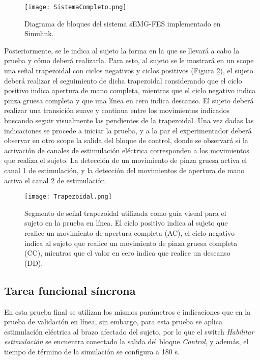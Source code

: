 \begin{figure}[htbp]
	\centering
	\texttt{[image: SistemaCompleto.png]}
	\caption{Diagrama de bloques del sistema sEMG-FES implementado en Simulink\textregistered.}
	\label{Figura: SisComp}
\end{figure}

\newpage
Posteriormente, se le indica al sujeto la forma en la que se llevará a cabo la prueba y cómo deberá realizarla. Para esto, al sujeto se le mostrará en un scope una señal trapezoidal con ciclos negativos y ciclos positivos (Figura \ref{Figura: Trapezoidal}), el sujeto deberá realizar el seguimiento de dicha trapezoidal considerando que el ciclo positivo indica apertura de mano completa, mientras que el ciclo negativo indica pinza gruesa completa y que una línea en cero indica descanso. El sujeto deberá realizar una transición suave y continua entre los movimientos indicados buscando seguir visualmente las pendientes de la trapezoidal. Una vez dadas las indicaciones se procede a iniciar la prueba, y a la par el experimentador deberá observar en otro scope la salida del bloque de control, donde se observará si la activación de canales de estimulación eléctrica corresponden a los movimientos que realiza el sujeto. La detección de un movimiento de pinza gruesa activa el canal 1 de estimulación, y la detección del movimientos de apertura de mano activa el canal 2 de estimulación.

\vfill
\begin{figure}[htbp]
	\centering
	\texttt{[image: Trapezoidal.png]}
	\caption[Segmento de señal trapezoidal patrón]{Segmento de señal trapezoidal utilizada como guía visual para el sujeto en la prueba en línea. El ciclo positivo indica al sujeto que realice un movimiento de apertura completa (AC), el ciclo negativo indica al sujeto que realice un movimiento de pinza gruesa completa (CC), mientras que el valor en cero indica que realice un descanso (DD).}
	\label{Figura: Trapezoidal}
\end{figure}
\vfill

\newpage
\subsection{Tarea funcional síncrona}\label{Sec: TareaObj}
En esta prueba final se utilizan los mismos parámetros e indicaciones que en la prueba de validación en línea, sin embargo, para esta prueba se aplica estimulación eléctrica al brazo afectado del sujeto, por lo que el switch \emph{Habilitar estimulación} se encuentra conectado la salida del bloque \emph{Control}, y además, el tiempo de término de la simulación se configura a 180 s.

